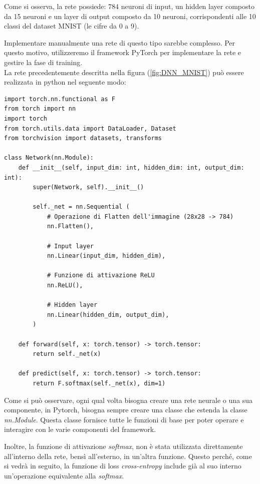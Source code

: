Come si osserva, la rete possiede: $784$ neuroni di input, un hidden layer 
composto da 15 neuroni e un layer di output composto da 10 neuroni, corrispondenti 
alle 10 classi del dataset MNIST (le cifre da 0 a 9).

Implementare manualmente una rete di questo tipo sarebbe complesso. 
Per questo motivo, utilizzeremo il framework PyTorch per implementare la rete e 
gestire la fase di training.
\\
La rete precedentemente descritta nella figura (\ref{fig:DNN_MNIST}) 
può essere realizzata in python nel seguente modo:

\begin{lstlisting}
import torch.nn.functional as F
from torch import nn
import torch
from torch.utils.data import DataLoader, Dataset
from torchvision import datasets, transforms

class Network(nn.Module):
    def __init__(self, input_dim: int, hidden_dim: int, output_dim: int):
        super(Network, self).__init__()
        
        self._net = nn.Sequential (
            # Operazione di Flatten dell'immagine (28x28 -> 784)
            nn.Flatten(),                      
            
            # Input layer
            nn.Linear(input_dim, hidden_dim),  

            # Funzione di attivazione ReLU
            nn.ReLU(), 
            
            # Hidden layer
            nn.Linear(hidden_dim, output_dim), 
        )
        
    def forward(self, x: torch.tensor) -> torch.tensor:
        return self._net(x)
    
    def predict(self, x: torch.tensor) -> torch.tensor:
        return F.softmax(self._net(x), dim=1)

\end{lstlisting}

Come si può osservare, ogni qual volta bisogna creare una rete neurale o 
una sua componente, in Pytorch, bisogna sempre creare una classe che 
estenda la classe \textit{nn.Module}. Questa classe fornisce tutte le funzioni di 
base per poter operare e interagire con le varie componenti del framework.
 
Inoltre, la funzione di attivazione \textit{softmax}, non è stata utilizzata 
direttamente all'interno della rete, bensì all'esterno, in un'altra funzione. 
Questo perché, come si vedrà in seguito, la funzione di loss \textit{cross-entropy} 
include già al suo interno un'operazione equivalente alla \textit{softmax}.

